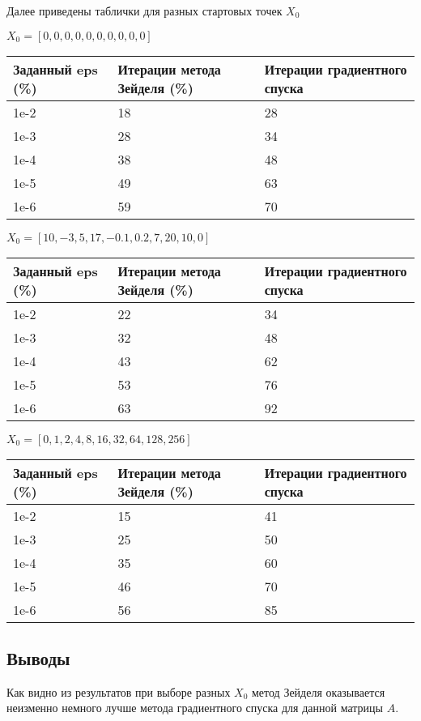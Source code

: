 \documentclass[paper=a4, fontsize=11pt]{scrartcl} %
\numberwithin{equation}{section} %
\numberwithin{figure}{section} %
\numberwithin{table}{section} %
\begin{document}
Далее приведены таблички для разных стартовых точек $X_0$

$X_0 = [0, 0, 0, 0, 0, 0, 0, 0, 0, 0]$

\begin{tabular}{|p{3 cm}|p{4 cm}|p{4 cm}|}
\hline
	Заданный eps (\%) & Итерации метода Зейделя (\%) & Итерации градиентного спуска\\
\hline
	1e-2 & 18 & 28\\
\hline
	1e-3 & 28 & 34\\
\hline
	1e-4 & 38 & 48\\
\hline
	1e-5 & 49 & 63\\
\hline
	1e-6 & 59 & 70\\
    
\hline
\end{tabular}

$X_0 = [10, -3, 5, 17, -0.1, 0.2, 7, 20, 10, 0]$

\begin{tabular}{|p{3 cm}|p{4 cm}|p{4 cm}|}
\hline
	Заданный eps (\%) & Итерации метода Зейделя (\%) & Итерации градиентного спуска\\
\hline
	1e-2 & 22 & 34\\
\hline
	1e-3 & 32 & 48\\
\hline
	1e-4 & 43 & 62\\
\hline
	1e-5 & 53 & 76\\
\hline
	1e-6 & 63 & 92\\
   \end{tabular}
    
$X_0 = [0, 1, 2, 4, 8, 16, 32, 64, 128, 256]$

\begin{tabular}{|p{3 cm}|p{4 cm}|p{4 cm}|}
\hline
	Заданный eps (\%) & Итерации метода Зейделя (\%) & Итерации градиентного спуска\\
\hline
	1e-2 & 15 & 41\\
\hline
	1e-3 & 25 & 50\\
\hline
	1e-4 & 35 & 60\\
\hline
	1e-5 & 46 & 70\\
\hline
	1e-6 & 56 & 85\\
    
\end{tabular}

\subsection{Выводы}
Как видно из результатов при выборе разных $X_0$ метод Зейделя оказывается неизменно немного лучше метода градиентного спуска для данной матрицы $A$.
\end{document}
